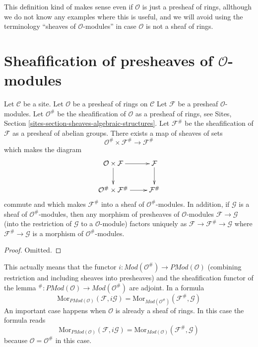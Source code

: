 \noindent
This definition kind of makes sense even if $\mathcal{O}$ is just a
presheaf of rings, allthough we do not know any examples where
this is useful, and we will avoid using the terminology
``sheaves of $\mathcal{O}$-modules''
in case $\mathcal{O}$ is not a sheaf of rings.



\section{Sheafification of presheaves of $\mathcal{O}$-modules}
\label{section-sheafification-presheaves-modules}

\begin{lemma}
\label{lemma-sheafification-presheaf-modules}
Let $\mathcal{C}$ be a site.
Let $\mathcal{O}$ be a presheaf of rings on $\mathcal{C}$
Let $\mathcal{F}$ be a presheaf $\mathcal{O}$-modules.
Let $\mathcal{O}^\#$ be the sheafification of $\mathcal{O}$ as a presheaf
of rings, see Sites, Section \ref{sites-section-sheaves-algebraic-structures}.
Let $\mathcal{F}^\#$ be the sheafification of $\mathcal{F}$
as a presheaf of abelian groups. There exists a map of
sheaves of sets
$$
\mathcal{O}^\# \times \mathcal{F}^\#
\longrightarrow
\mathcal{F}^\#
$$
which makes the diagram
$$
\xymatrix{
\mathcal{O} \times \mathcal{F} \ar[r] \ar[d] &
\mathcal{F} \ar[d] \\
\mathcal{O}^\# \times \mathcal{F}^\# \ar[r] &
\mathcal{F}^\#
}
$$
commute and which makes $\mathcal{F}^\#$ into a sheaf
of $\mathcal{O}^\#$-modules. In addition, if $\mathcal{G}$
is a sheaf of $\mathcal{O}^\#$-modules, then any morphism
of presheaves of $\mathcal{O}$-modules $\mathcal{F} \to \mathcal{G}$
(into the restriction of $\mathcal{G}$ to a $\mathcal{O}$-module)
factors uniquely as $\mathcal{F} \to \mathcal{F}^\# \to \mathcal{G}$
where $\mathcal{F}^\# \to \mathcal{G}$ is a morphism of
$\mathcal{O}^\#$-modules.
\end{lemma}

\begin{proof}
Omitted.
\end{proof}

\noindent
This actually means that the functor
$i : \textit{Mod}(\mathcal{O}^\#) \to \textit{PMod}(\mathcal{O})$
(combining restriction and including sheaves into presheaves)
and the sheafification functor of the lemma
${}^\# : \textit{PMod}(\mathcal{O}) \to \textit{Mod}(\mathcal{O}^\#)$
are adjoint. In a formula
$$
\text{Mor}_{\textit{PMod}(\mathcal{O})}(\mathcal{F}, i\mathcal{G})
=
\text{Mor}_{\textit{Mod}(\mathcal{O}^\#)}(\mathcal{F}^\#, \mathcal{G})
$$
An important case happens when $\mathcal{O}$ is already a sheaf of
rings. In this case the formula reads
$$
\text{Mor}_{\textit{PMod}(\mathcal{O})}(\mathcal{F}, i\mathcal{G})
=
\text{Mor}_{\textit{Mod}(\mathcal{O})}(\mathcal{F}^\#, \mathcal{G})
$$
because $\mathcal{O} = \mathcal{O}^\#$ in this case.

